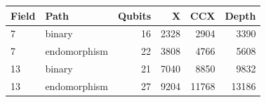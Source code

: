 \begin{tabular}{llrrrr}\toprule Field & Path & Qubits & X & CCX & Depth\\\midrule
7 & binary & 16 & 2328 & 2904 & 3390\\
7 & endomorphism & 22 & 3808 & 4766 & 5608\\
13 & binary & 21 & 7040 & 8850 & 9832\\
13 & endomorphism & 27 & 9204 & 11768 & 13186\\
\bottomrule\end{tabular}
